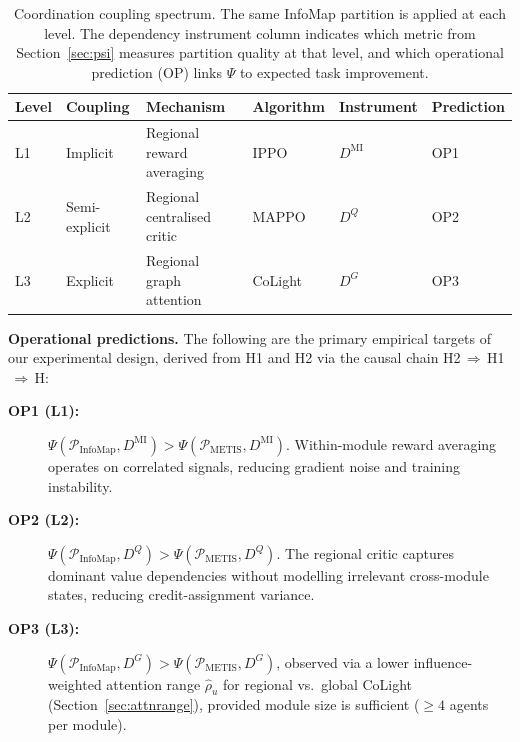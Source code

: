 \documentclass{article}
\begin{document}
\begin{table}[t]
    \centering
    \caption{Coordination coupling spectrum. The same InfoMap partition is applied
        at each level. The dependency instrument column indicates which metric from
        Section~\ref{sec:psi} measures partition quality at that level, and which
        operational prediction (OP) links $\Psi$ to expected task improvement.}
    \label{tab:levels}
    \small
    \begin{tabular}{llllll}
        \toprule
        Level & Coupling      & Mechanism                   & Algorithm & Instrument        & Prediction \\
        \midrule
        L1    & Implicit      & Regional reward averaging   & IPPO      & $D^{\mathrm{MI}}$ & OP1        \\
        L2    & Semi-explicit & Regional centralised critic & MAPPO     & $D^{Q}$           & OP2        \\
        L3    & Explicit      & Regional graph attention    & CoLight   & $D^{G}$           & OP3        \\
        \bottomrule
    \end{tabular}
\end{table}

\noindent\textbf{Operational predictions.}
The following are the primary empirical targets of our experimental design,
derived from H1 and H2 via the causal chain H2$\,\Rightarrow\,$H1$\,\Rightarrow\,$H:
\begin{description}
    \item[\textbf{OP1 (L1):}]
          $\Psi(\mathcal{P}_{\mathrm{InfoMap}}, D^{\mathrm{MI}}) >
              \Psi(\mathcal{P}_{\mathrm{METIS}}, D^{\mathrm{MI}})$.
          Within-module reward averaging operates on correlated signals, reducing
          gradient noise and training instability.
    \item[\textbf{OP2 (L2):}]
          $\Psi(\mathcal{P}_{\mathrm{InfoMap}}, D^{Q}) >
              \Psi(\mathcal{P}_{\mathrm{METIS}}, D^{Q})$.
          The regional critic captures dominant value dependencies without modelling
          irrelevant cross-module states, reducing credit-assignment variance.
    \item[\textbf{OP3 (L3):}]
          $\Psi(\mathcal{P}_{\mathrm{InfoMap}}, D^{G}) >
              \Psi(\mathcal{P}_{\mathrm{METIS}}, D^{G})$, observed via a lower
          influence-weighted attention range $\hat{\rho}_u$ for regional vs.\ global
          CoLight (Section~\ref{sec:attnrange}), provided module size is
          sufficient (${\geq}4$ agents per module).
\end{description}
\end{document}
